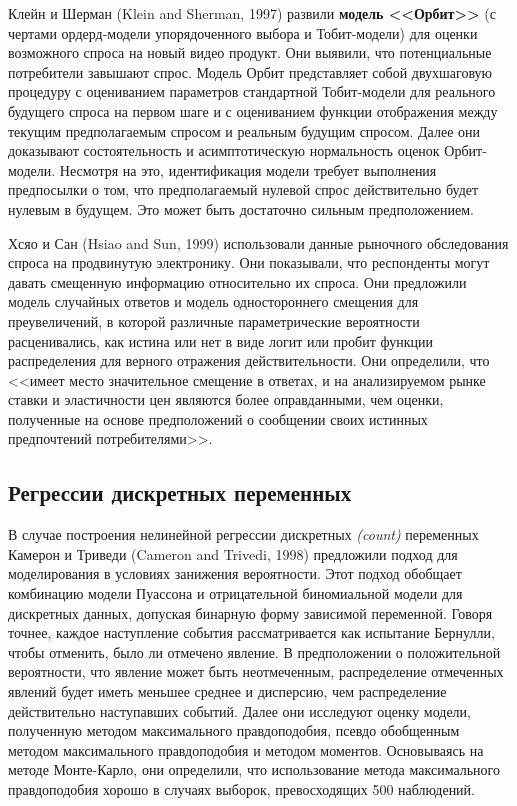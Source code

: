 Клейн и Шерман (Klein and Sherman, 1997) развили {\bf модель <<Орбит>>} (с чертами ордерд-модели упорядоченного выбора и Тобит-модели) для оценки возможного спроса на новый видео продукт. Они выявили, что потенциальные потребители завышают спрос. Модель Орбит представляет собой двухшаговую процедуру с оцениванием параметров стандартной Тобит-модели для реального будущего спроса на первом шаге и с оцениванием функции отображения между текущим предполагаемым спросом и реальным будущим спросом. Далее они доказывают состоятельность и асимптотическую нормальность оценок Орбит-модели. Несмотря на это, идентификация модели требует выполнения предпосылки о том, что предполагаемый нулевой спрос действительно будет нулевым в будущем. Это может быть достаточно сильным предположением.
 
Хсяо и Сан (Hsiao and Sun, 1999) использовали данные рыночного обследования спроса на продвинутую электронику. Они показывали, что респонденты могут давать смещенную информацию относительно их спроса. Они предложили модель случайных ответов и модель одностороннего смещения для преувеличений, в которой различные параметрические вероятности расценивались, как истина или нет в виде логит или пробит функции распределения для верного отражения действительности. Они определили, что <<имеет место значительное смещение в ответах, и на анализируемом рынке ставки и эластичности цен являются более оправданными, чем оценки, полученные на основе  предположений о сообщении своих истинных предпочтений потребителями>>.

\subsection*{Регрессии дискретных переменных} 
В случае построения нелинейной регрессии дискретных \emph{(count)} переменных Камерон и Триведи (Cameron and Trivedi, 1998) предложили подход для моделирования в условиях занижения вероятности. Этот подход обобщает комбинацию модели Пуассона и отрицательной биномиальной модели для дискретных данных, допуская бинарную форму зависимой переменной.  Говоря точнее, каждое наступление события рассматривается как испытание Бернулли, чтобы отменить, было ли отмечено явление. В предположении о положительной вероятности, что явление может быть неотмеченным, распределение отмеченных явлений будет иметь меньшее среднее и дисперсию, чем распределение действительно наступавших событий. Далее они исследуют оценку модели, полученную методом максимального правдоподобия, псевдо обобщенным методом максимального правдоподобия и методом моментов. Основываясь на методе Монте-Карло, они определили, что использование метода максимального правдоподобия хорошо в случаях выборок, превосходящих 500 наблюдений.

